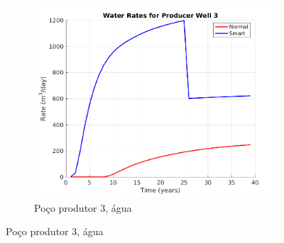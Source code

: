 \begin{figure}[!ht]
	~
	\begin{subfigure}[b]{.3\textwidth}
		\includegraphics[width=\textwidth]{figs/resultadosLSAIGUP/LSAIGUP_WaterWell3_Zoom}
		\caption{Po\c{c}o produtor 3, \'{a}gua}
		\label{LSAIGUP_WaterWell3}
	\end{subfigure}
	

\end{figure}
